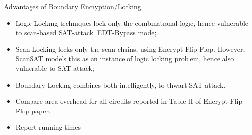 \begin{frame}{Advantages of Boundary Encryption/Locking}
\begin{itemize}
\item Logic Locking techniques lock only the combinational logic, hence vulnerable to scan-based SAT-attack, EDT-Bypass mode; 
\item Scan Locking locks only the scan chains, using Encrypt-Flip-Flop. However, ScanSAT models this as an instance of logic locking problem, hence also vulnerable to SAT-attack; 
\item \alert{Boundary Locking} combines both intelligently, to thwart SAT-attack. 
\item Compare area overhead for all circuits reported in Table II of Encrypt Flip-Flop paper. 
\item Report running times
\end{itemize}
\end{frame}
